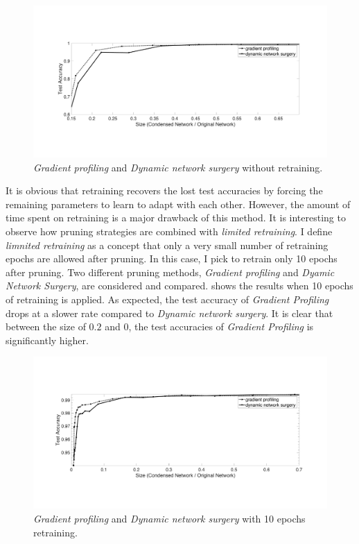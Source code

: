 \documentclass[a4paper,12pt]{report}
\begin{document}
\begin{figure}[!h]
  \centering
  \includegraphics[width=\textwidth]{gradient_profile_noretrain.pdf}
  \caption{\textit{Gradient profiling} and \textit{Dynamic network surgery} without retraining.}
  \label{fig:gpvsds_noretrain}
\end{figure}

It is obvious that retraining recovers the lost test accuracies by forcing
the remaining parameters to learn to adapt with each other.
However, the amount of time spent on retraining is a major drawback of this method.
It is interesting to observe how pruning strategies are combined with \textit{limited retraining}.
I define \textit{limnited retraining} as a concept that only a very small number
of retraining epochs are allowed after pruning.
In this case, I pick to retrain only 10 epochs after pruning.
Two different pruning methods, \textit{Gradient profiling} and
\textit{Dyamic Network Surgery}, are considered and compared.
 shows the results when 10 epochs of retraining
is applied.
As expected, the test accuracy of \textit{Gradient Profiling} drops at a slower
rate compared to \textit{Dynamic network surgery}.
It is clear that between the size of $0.2$ and $0$, the test accuracies of
\textit{Gradient Profiling} is significantly higher.

\begin{figure}[!h]
  \centering
  \includegraphics[width=\textwidth]{gradient_profile_10epoch.pdf}
  \caption{\textit{Gradient profiling} and \textit{Dynamic network surgery} with 10 epochs retraining.}
  \label{fig:gpvsds_10retrain}
\end{figure}
\end{document}
